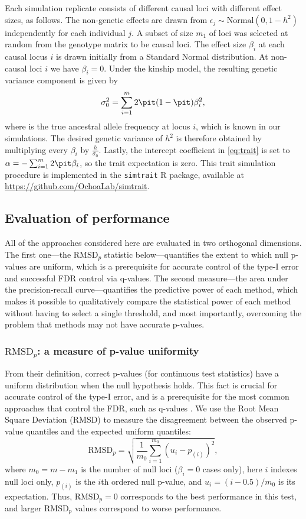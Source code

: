 \documentclass[11pt]{article}
\newcommand{\rmsd}{\text{RMSD}_p}
\begin{document}
Each simulation replicate consists of different causal loci with different effect sizes, as follows.
The non-genetic effects are drawn from $\epsilon_j \sim \text{Normal}(0, 1 - h^2 )$ independently for each individual $j$.
A subset of size $m_1$ of loci was selected at random from the genotype matrix to be causal loci.
The effect size $\beta_i$ at each causal locus $i$ is drawn initially from a Standard Normal distribution.
At non-causal loci $i$ we have $\beta_i = 0$.
Under the kinship model, the resulting genetic variance component is given by
$$
\sigma^2_0
=
\sum_{i = 1}^m 2 \pit ( 1 - \pit ) \beta_i^2 ,
$$
where \pit is the true ancestral allele frequency at locus $i$, which is known in our simulations.
The desired genetic variance of $h^2$ is therefore obtained by multiplying every $\beta_i$ by $\frac{h}{ \sigma_0 }$.
Lastly, the intercept coefficient in \cref{eq:trait} is set to $\alpha = - \sum_{i=1}^m 2 \pit \beta_i$, so the trait expectation is zero.
This trait simulation procedure is implemented in the \texttt{simtrait} R package, available at
\url{https://github.com/OchoaLab/simtrait}.

\subsection{Evaluation of performance}

All of the approaches considered here are evaluated in two orthogonal dimensions.
The first one---the $\rmsd$ statistic below---quantifies the extent to which null p-values are uniform, which is a prerequisite for accurate control of the type-I error and successful FDR control via q-values.
The second measure---the area under the precision-recall curve---quantifies the predictive power of each method, which makes it possible to qualitatively compare the statistical power of each method without having to select a single threshold, and most importantly, overcoming the problem that methods may not have accurate p-values.

\subsubsection{$\rmsd$: a measure of p-value uniformity}

From their definition, correct p-values (for continuous test statistics) have a uniform distribution when the null hypothesis holds.
This fact is crucial for accurate control of the type-I error, and is a prerequisite for the most common approaches that control the FDR, such as q-values \citep{storey_positive_2003, storey_statistical_2003}.
We use the Root Mean Square Deviation (RMSD) to measure the disagreement between the observed p-value quantiles and the expected uniform quantiles:
$$
\rmsd
=
\sqrt{ \frac{1}{m_0} \sum_{i = 1}^{m_0} \left( u_i - p_{(i)} \right)^2 },
$$
where
$m_0 = m - m_1$ is the number of null loci ($\beta_i = 0$ cases only),
here $i$ indexes null loci only,
$p_{(i)}$ is the $i$th ordered null p-value, and
$u_i = ( i - 0.5 ) / m_0$ is its expectation.
Thus, $\rmsd = 0$ corresponds to the best performance in this test, and larger $\rmsd$ values correspond to worse performance.
\end{document}
